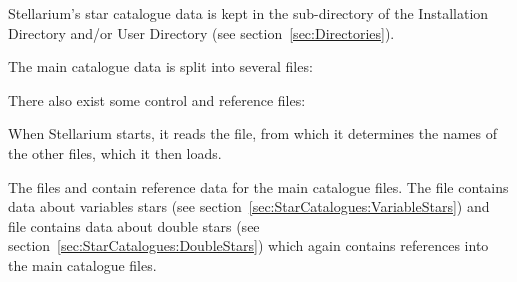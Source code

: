 Stellarium's star catalogue data is kept in the 
sub-directory of the Installation Directory and/or User Directory (see
section~\ref{sec:Directories}).

The main catalogue data is split into several files:

\begin{description}
\item[]
\item[]
\item[]
\item[]
\item[]
\item[]
\item[]
\item[]
\item[]
\end{description}

There also exist some control and reference files:

\begin{description}
\item[]
\item[]
\item[]
\item[]
\item[]
\item[]
\item[]
\item[]
\end{description}

When Stellarium starts, it reads the  file, from which it
determines the names of the other files, which it then loads.

The files  and 
contain reference data for the main catalogue files. The
file  contains data about variables stars
(see section~\ref{sec:StarCatalogues:VariableStars}) and file  
contains data about double stars (see section~\ref{sec:StarCatalogues:DoubleStars}) 
which again contains references into the main catalogue files.


